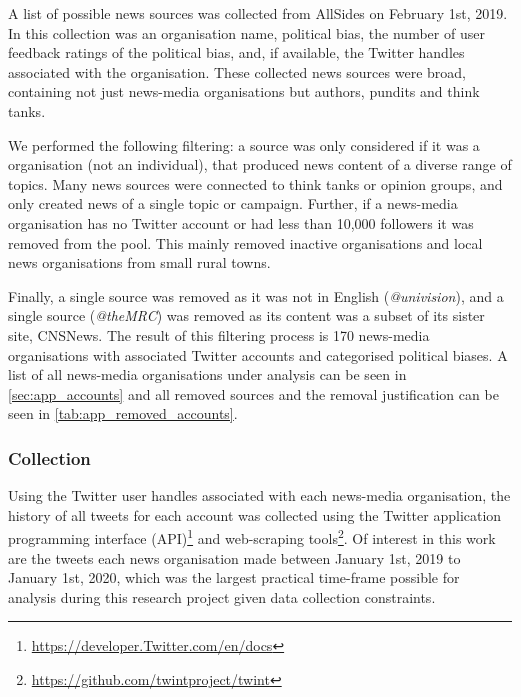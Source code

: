 A list of possible news sources was collected from AllSides on February 1st, 2019. In this collection was an organisation name, political bias, the number of user feedback ratings of the political bias, and, if available, the Twitter handles associated with the organisation. These collected news sources were broad, containing not just news-media organisations but authors, pundits and think tanks. 

We performed the following filtering: a source was only considered if it was a organisation (not an individual), that produced news content of a diverse range of topics. Many news sources were connected to think tanks or opinion groups, and only created news of a single topic or campaign. Further, if a news-media organisation has no Twitter account or had less than 10,000 followers it was removed from the pool. This mainly removed inactive organisations and local news organisations from small rural towns. 

Finally, a single source was removed as it was not in English (\emph{@univision}), and a single source (\emph{@theMRC}) was removed as its content was a subset of its sister site, CNSNews.  The result of this filtering process is 170 news-media organisations with associated Twitter accounts and categorised political biases.  A list of all news-media organisations under analysis can be seen in \autoref{sec:app_accounts} and all removed sources and the removal justification can be seen in \autoref{tab:app_removed_accounts}.

\subsubsection{Collection}
Using the Twitter user handles associated with each news-media organisation, the history of all tweets for each account was collected using the Twitter application programming interface (API)\footnote{\url{https://developer.Twitter.com/en/docs}} and web-scraping tools\footnote{\url{https://github.com/twintproject/twint}}. Of interest in this work are the tweets each news organisation made between January 1st, 2019 to January 1st, 2020, which was the largest practical time-frame possible for analysis during this research project given data collection constraints. 


